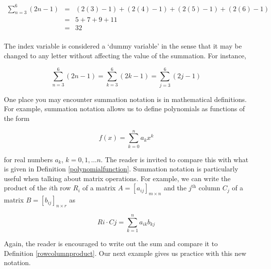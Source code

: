 \documentclass{ximera}
\begin{document}
\[ \begin{array}{rcl}

\displaystyle{\sum_{n=3}^{6}(2n-1) } & = & (2(3)-1) + (2(4)-1) + (2(5)-1) +  (2(6)-1) \\
                     & = &  5 + 7 + 9 + 11 \\
                     & = & 32 \\
\end{array} \]

The index variable  is considered a `dummy variable' in the sense that it may be changed to any letter without affecting the value of the summation.  For instance, 

\[ \displaystyle{\sum_{n=3}^{6}(2n-1)} = \displaystyle{\sum_{k=3}^{6}(2k-1)} = \displaystyle{\sum_{j=3}^{6}(2j-1)}\]

One place you may encounter summation notation is in mathematical definitions.  For example, summation notation allows us to define polynomials as functions of the form

\[ f(x) = \displaystyle{\sum_{k=0}^{n} a_{k} x^{k}} \]

for real numbers $a_{k}$, $k = 0, 1, \ldots n$.  The reader is invited to compare this with what is given in Definition \ref{polynomialfunction}.  Summation notation is particularly useful when talking about matrix operations.  For example, we can write the product of the $i$th row $R_{i}$ of a matrix $A = [a_{ij}]_{m \times n}$ and the $j^{\text{th}}$ column $C_{j}$ of a matrix $B = [b_{ij}]_{n \times r}$ as

\[ Ri \cdot Cj = \displaystyle{\sum_{k=1}^{n} a_{ik}b_{kj}} \]

Again, the reader is encouraged to write out the sum and compare it to Definition \ref{rowcolumnproduct}.  Our next example gives us practice with this new notation. 
\end{document}
